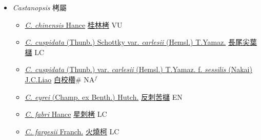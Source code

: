 
  \begin{itemize}
 \item[] \textit{Castanopsis} 栲屬
                    
  \begin{itemize}
        \item[] \href{http://www.theplantlist.org/tpl1.1/search?q=Castanopsis+chinensis}{\textit{C. chinensis} Hance}   \href{\detokenize{http://taibnet.sinica.edu.tw/chi/taibnet_species_list.php?T2=桂林栲&T2_new_value=true&fr=y}}{桂林栲} VU
        \item[] \href{http://www.theplantlist.org/tpl1.1/search?q=Castanopsis+cuspidata+var.+carlesii}{\textit{C. cuspidata} (Thunb.) Schottky var. \textit{carlesii} (Hemsl.) T.Yamaz.}   \href{\detokenize{http://taibnet.sinica.edu.tw/chi/taibnet_species_list.php?T2=長尾尖葉櫧&T2_new_value=true&fr=y}}{長尾尖葉櫧} LC
        \item[] \href{http://www.theplantlist.org/tpl1.1/search?q=Castanopsis+cuspidata+var.+carlesii+ f. +sessilis}{\textit{C. cuspidata} (Thunb.) var. \textit{carlesii} (Hemsl.) T.Yamaz.  f.  \textit{sessilis} (Nakai) J.C.Liao}   \href{\detokenize{http://taibnet.sinica.edu.tw/chi/taibnet_species_list.php?T2=白校欑&T2_new_value=true&fr=y}}{白校欑}\# NA$^f$
        \item[] \href{http://www.theplantlist.org/tpl1.1/search?q=Castanopsis+eyrei}{\textit{C. eyrei} (Champ. ex Benth.) Hutch.}   \href{\detokenize{http://taibnet.sinica.edu.tw/chi/taibnet_species_list.php?T2=反刺苦櫧&T2_new_value=true&fr=y}}{反刺苦櫧} EN
        \item[] \href{http://www.theplantlist.org/tpl1.1/search?q=Castanopsis+fabri}{\textit{C. fabri} Hance}   \href{\detokenize{http://taibnet.sinica.edu.tw/chi/taibnet_species_list.php?T2=星刺栲&T2_new_value=true&fr=y}}{星刺栲} LC
        \item[] \href{http://www.theplantlist.org/tpl1.1/search?q=Castanopsis+fargesii}{\textit{C. fargesii} Franch.}   \href{\detokenize{http://taibnet.sinica.edu.tw/chi/taibnet_species_list.php?T2=火燒柯&T2_new_value=true&fr=y}}{火燒柯} LC

\end{itemize}
\end{itemize}
